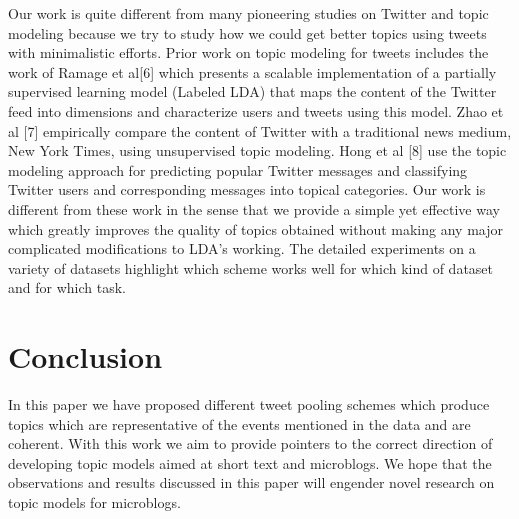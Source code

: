 \documentclass[10pt,a5paper,twoside]{article}
\begin{document}

Our work is quite different from many pioneering studies on Twitter and topic modeling because we try to study how we could get better topics using tweets with minimalistic efforts. Prior work on topic modeling for tweets includes the work of Ramage et al[6] which presents a scalable implementation of a partially supervised learning model (Labeled LDA) that maps the content of the Twitter feed into dimensions and characterize users and tweets using this model. Zhao et al [7] empirically compare the content of Twitter with a traditional news medium, New York Times, using unsupervised topic modeling. Hong et al [8] use the topic modeling approach for predicting popular Twitter messages and classifying Twitter users and corresponding messages into topical categories. Our work is different from these work in the sense that we provide a simple yet effective way which greatly improves the quality of topics obtained without making any major complicated modifications to LDA's working. The detailed experiments on a variety of datasets highlight which scheme works well for which kind of dataset and for which task.
\\

\section{Conclusion}
In this paper we have proposed different tweet pooling schemes which produce topics which are representative of the events mentioned in the data and are coherent. With this work we aim to provide pointers to the correct direction of developing topic models aimed at short text and microblogs. We hope that the observations and results discussed in this paper will engender novel research on topic models for microblogs.
\end{document}
